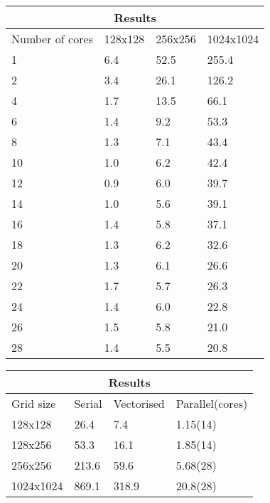 \documentclass{article}
\begin{document}
\begin{multicols}{2}
\begin{center}
  \begin{tabular}{ |p{1.5cm}||p{1.5cm}|p{1.5cm}|p{1.5cm}| }
 \hline
 \multicolumn{4}{|c|}{Results} \\
 \hline
 Number of cores & 128x128 & 256x256 & 1024x1024 \\
 \hline
 1  & 6.4 &  52.5  &  255.4   \\
 2  & 3.4 &  26.1  &  126.2   \\
 4  & 1.7 &  13.5  &  66.1    \\ 
 6  & 1.4 &  9.2   &  53.3    \\ 
 8  & 1.3 &  7.1   &  43.4    \\ 
 10 & 1.0 &  6.2   &  42.4    \\
 12 & 0.9 &  6.0   &  39.7    \\
 14 & 1.0 &  5.6   &  39.1    \\ 
 16 & 1.4 &  5.8   &  37.1    \\ 
 18 & 1.3 &  6.2   &  32.6    \\
 20 & 1.3 &  6.1   &  26.6    \\
 22 & 1.7 &  5.7   &  26.3    \\ 
 24 & 1.4 &  6.0   &  22.8    \\ 
 26 & 1.5 &  5.8   &  21.0    \\ 
 28 & 1.4 &  5.5   &  20.8    \\
 \hline
\end{tabular}
\label{tab:parallelresults}
\end{center}

\begin{center}
  \begin{tabular}{ |p{1.5cm}||p{1cm}|p{1.5cm}|p{2cm}| }
 \hline
 \multicolumn{4}{|c|}{Results} \\
 \hline
 Grid size & Serial & Vectorised & Parallel(cores) \\
 \hline
 128x128    & 26.4  & 7.4   &  1.15(14)   \\
 128x256    & 53.3  & 16.1  &  1.85(14)   \\
 256x256    & 213.6 & 59.6  &  5.68(28)   \\
 1024x1024  & 869.1 & 318.9 &  20.8(28)    \\ 
 \hline
\end{tabular}
\label{tab:stageruntimes}
\end{center}


\end{multicols}
\end{document}
